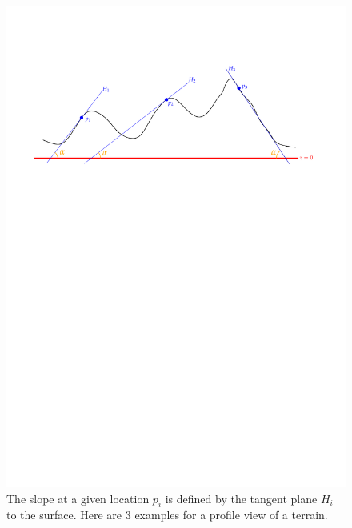 \begin{figure}
  \centering
  \includegraphics[width=\linewidth]{figs/slope_concept}
  \caption{The slope at a given location $p_i$ is defined by the tangent plane $H_i$ to the surface. Here are 3 examples for a profile view of a terrain.}%
\label{fig:slope_concept}
\end{figure}

